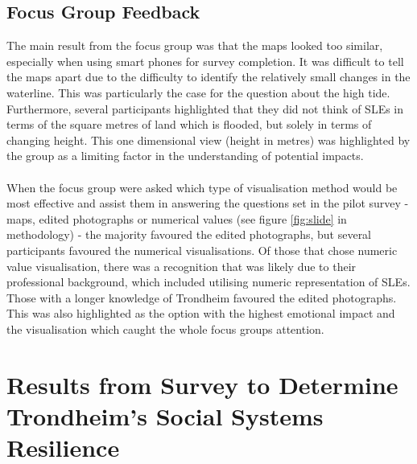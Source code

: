 \paragraph{}


\subsection{Focus Group Feedback}
The main result from the focus group  was that the maps looked too similar, especially when using smart phones for survey completion. It was difficult to tell the maps apart due to the difficulty to identify the relatively small changes in the waterline. This was particularly the case for the question about the high tide. Furthermore, several participants highlighted that they did not think of SLEs in terms of the square metres of land which is flooded, but solely in terms of changing height. This one dimensional view (height in metres) was highlighted by the group as a limiting factor in the understanding of potential impacts. 
\paragraph{}

When the focus group were asked which type of visualisation method would be most effective and assist them in answering the questions set in the pilot survey - maps, edited photographs or numerical values (see figure \ref{fig:slide} in methodology) - the majority favoured the edited photographs, but several participants favoured the numerical visualisations.
Of those that chose numeric value visualisation, there was a recognition that was likely due to their professional background, which included utilising numeric representation of SLEs. Those with a longer knowledge of Trondheim favoured the edited photographs. This was also highlighted as the option with the highest emotional impact and the visualisation which caught the whole focus groups attention.
\paragraph{}






\section{Results from Survey to Determine Trondheim's Social Systems Resilience}


